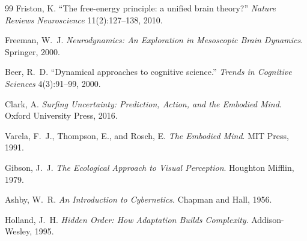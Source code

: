 \documentclass[11pt, a4paper]{article}
\theoremstyle{definition}
\theoremstyle{remark}
\begin{document}
\begin{thebibliography}{99}
Friston, K.
``The free-energy principle: a unified brain theory?''
\textit{Nature Reviews Neuroscience} 11(2):127--138, 2010.

Freeman, W.~J.
\textit{Neurodynamics: An Exploration in Mesoscopic Brain Dynamics}.
Springer, 2000.

Beer, R.~D.
``Dynamical approaches to cognitive science.''
\textit{Trends in Cognitive Sciences} 4(3):91--99, 2000.

Clark, A.
\textit{Surfing Uncertainty: Prediction, Action, and the Embodied Mind}.
Oxford University Press, 2016.

Varela, F.~J., Thompson, E., and Rosch, E.
\textit{The Embodied Mind}.
MIT Press, 1991.

Gibson, J.~J.
\textit{The Ecological Approach to Visual Perception}.
Houghton Mifflin, 1979.

Ashby, W.~R.
\textit{An Introduction to Cybernetics}.
Chapman and Hall, 1956.

Holland, J.~H.
\textit{Hidden Order: How Adaptation Builds Complexity}.
Addison-Wesley, 1995.

\end{thebibliography}
\end{document}
